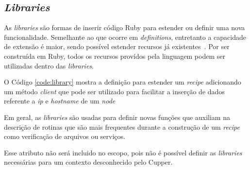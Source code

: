 \subsection{\textit{Libraries}}

As \textit{libraries} são formas de inserir código Ruby para estender ou definir
uma nova funcionalidade. Semelhante ao que ocorre em \textit{definitions}, entretanto a
capacidade de extensão é maior, sendo possível estender recursos já
existentes~\cite{chefdoc:2016}. Por ser construída em Ruby, todos os
recursos provídos pela linguagem podem ser utilizadas dentro das
\textit{libraries}.

O Código \ref{code:library} mostra a definição para estender um
\textit{recipe} adicionando um método \textit{client} que pode ser utilizado
para facilitar a inserção de dados referente a \textit{ip} e \textit{hostname} de um
\textit{node}

\begin{minipage}{.90\textwidth}
  \lstset{style=shell}
  
\end{minipage}

Em geral, as \textit{libraries} são usadas para definir novas funções que
auxiliam na descrição de rotinas que são mais frequentes durante a
construção de um \textit{recipe} como verificação de arquivos ou serviços.

Esse atributo não será incluido no escopo, pois não é possível definir as \textit{libraries}
necessárias para um contexto desconhecido pelo Cupper.
